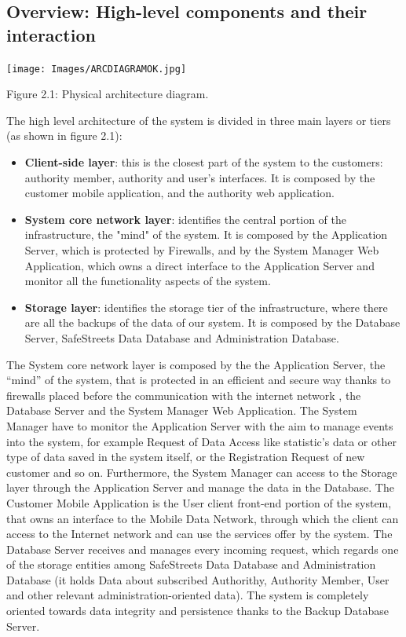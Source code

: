 \documentclass[12pt]{article}
\begin{document}
\subsection{Overview: High-level components and their interaction}
\vspace{5mm}
\begin{center}
\texttt{[image: Images/ARCDIAGRAMOK.jpg]}
\vspace{2mm}

Figure 2.1: Physical architecture diagram.
\end{center}
\vspace{3mm}
The high level architecture of the system is divided in three main layers or tiers (as shown in figure 2.1):
\begin{itemize}
\item \textbf{Client-side layer}: this is the closest part of the system to the customers: authority member, authority and user's interfaces. It is composed by the customer mobile application, and the authority web application.

\item \textbf{System core network layer}: identifies the central portion of the infrastructure, the "mind" of the system. It is composed by the Application Server, which is protected by Firewalls, and by the System Manager Web Application, which owns a direct interface to the Application Server and monitor all the functionality aspects of the system.

\item \textbf{Storage layer}: identifies the storage tier of the infrastructure, where there are all the backups of the data of our system. It is composed by the Database Server, SafeStreets Data Database and Administration Database.
\end{itemize}
The System core network layer is composed by the the Application Server, the “mind” of the system, that is protected in an efficient and secure way thanks to firewalls placed before the communication with the internet network , the Database Server and the System Manager Web Application.
The System Manager have to monitor the Application Server with the aim to manage
events into the system, for example Request of Data Access like statistic's data or other type of data saved in the system itself, or the Registration Request of new customer and so on.
Furthermore, the System Manager can access to the Storage layer through the Application Server and manage the data in the Database.
The Customer Mobile Application is the User client front-end portion of the system, that owns
an interface to the Mobile Data Network, through which the client can access to the Internet
network and can use the services offer by the system.
The Database Server receives and manages every incoming request, which regards one of the storage entities among SafeStreets Data Database and Administration Database (it holds
Data about subscribed Authorithy, Authority Member, User  and other relevant administration-oriented data). The system is completely oriented towards data integrity and persistence thanks to the Backup Database Server.
\end{document}

